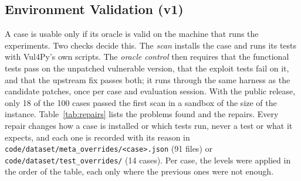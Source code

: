 \documentclass[ai,article,submit,oneauthor]{Definitions/mdpi}
\begin{document}
\subsection{Environment Validation (v1)}\label{sec:env}

A case is usable only if its oracle is valid on the machine that runs the experiments. Two checks decide this. The \emph{scan} installs the case and runs its tests with Vul4Py's own scripts. The \emph{oracle control} then requires that the functional tests pass on the unpatched vulnerable version, that the exploit tests fail on it, and that the upstream fix passes both; it runs through the same harness as the candidate patches, once per case and evaluation session. With the public release, only 18 of the 100 cases passed the first scan in a sandbox of the size of the instance. Table~\ref{tab:repairs} lists the problems found and the repairs. Every repair changes how a case is installed or which tests run, never a test or what it expects, and each one is recorded with its reason in \texttt{code/dataset/meta\_overrides/<case>.json} (91 files) or \texttt{code/dataset/test\_overrides/} (14 cases). Per case, the levels were applied in the order of the table, each only where the previous ones were not enough.
\end{document}
